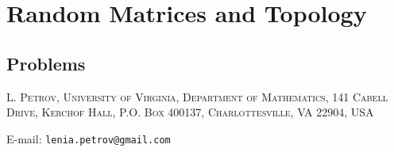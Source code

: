 \documentclass[letterpaper,11pt,oneside,reqno]{book}
\numberwithin{equation}{chapter}  %
\theoremstyle{definition}
\begin{document}
\chapter{Random Matrices and Topology}
\label{chap:lecture15}











































\section{Problems}



















\medskip

\textsc{L. Petrov, University of Virginia, Department of Mathematics, 141 Cabell Drive, Kerchof Hall, P.O. Box 400137, Charlottesville, VA 22904, USA}

E-mail: \texttt{lenia.petrov@gmail.com}
\end{document}
